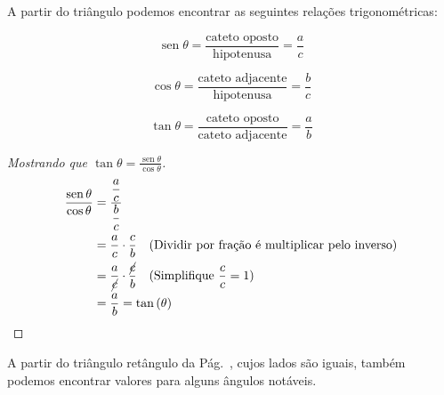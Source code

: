 \documentclass[12pt,openright,twoside,a4paper]{article}
\theoremstyle{definition}
\renewcommand{\sin}{\operatorname{sen}} %
\begin{document}
	A partir do triângulo podemos encontrar as seguintes relações trigonométricas:
	
	\begin{equation}
		\sin{\theta} = \frac{\text{cateto oposto}}{\text{hipotenusa}} = \frac{a}{c}
	\end{equation}
	
	\begin{equation}
		\cos{\theta} = \frac{\text{cateto adjacente}}{\text{hipotenusa}} = \frac{b}{c}
	\end{equation}
	
	\begin{equation}
		\tan{\theta} = \frac{\text{cateto oposto}}{\text{cateto adjacente}} = \frac{a}{b}
	\end{equation}
	
	\begin{proof}[Mostrando que $\tan{\theta} = \displaystyle \frac{\sin{\theta}}{\cos{\theta}}$]
		
		\begin{align*}
			\frac{\sin{\theta}}{\cos{\theta}} &= \displaystyle \frac{\displaystyle \frac{a}{c}}{\displaystyle \frac{b}{c}}\\
			&= \displaystyle \frac{a}{c} \cdot \frac{c}{b} \quad \text{(Dividir por fração é multiplicar pelo inverso)}\\
			&= \displaystyle \frac{a}{{\cancel{c}}} \cdot \frac{{\cancel{c}}}{b} \quad \text{(Simplifique $\frac{c}{c} = 1$)}\\
			&= \frac{a}{b} = \tan{(\theta)} \qedhere
		\end{align*}
	\end{proof}
	
	A partir do triângulo retângulo da Pág.~\pageref{fig:triangulo_retangulo}, cujos lados são iguais, também podemos encontrar valores para alguns ângulos notáveis.
	
\end{document}
